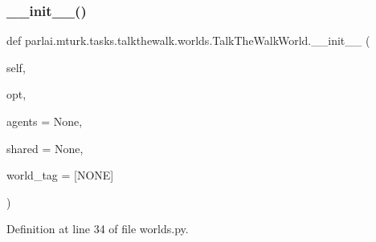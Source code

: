 \subsubsection{\texorpdfstring{\+\_\+\+\_\+init\+\_\+\+\_\+()}{\_\_init\_\_()}}
{\footnotesize\ttfamily def parlai.\+mturk.\+tasks.\+talkthewalk.\+worlds.\+Talk\+The\+Walk\+World.\+\_\+\+\_\+init\+\_\+\+\_\+ (\begin{DoxyParamCaption}\item[{}]{self,  }\item[{}]{opt,  }\item[{}]{agents = {\ttfamily None},  }\item[{}]{shared = {\ttfamily None},  }\item[{}]{world\+\_\+tag = {\ttfamily \textquotesingle{}\mbox{[}NONE\mbox{]}\textquotesingle{}} }\end{DoxyParamCaption})}



Definition at line 34 of file worlds.\+py.


